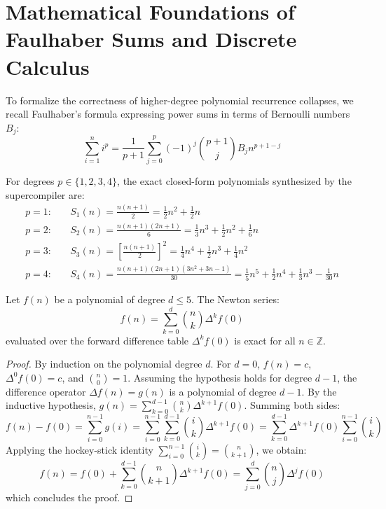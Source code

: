 \section{Mathematical Foundations of Faulhaber Sums and Discrete Calculus}
\label{sec:rec:faulhaber_proofs}

To formalize the correctness of higher-degree polynomial recurrence collapses, we recall Faulhaber's formula expressing power sums in terms of Bernoulli numbers $B_j$:
\begin{equation}
\sum_{i=1}^n i^p = \frac{1}{p+1} \sum_{j=0}^p (-1)^j \binom{p+1}{j} B_j n^{p+1-j}
\end{equation}

For degrees $p \in \{1, 2, 3, 4\}$, the exact closed-form polynomials synthesized by the supercompiler are:
\begin{align}
p=1: \quad & S_1(n) = \frac{n(n+1)}{2} = \frac{1}{2} n^2 + \frac{1}{2} n \\[0.8em]
p=2: \quad & S_2(n) = \frac{n(n+1)(2n+1)}{6} = \frac{1}{3} n^3 + \frac{1}{2} n^2 + \frac{1}{6} n \\[0.8em]
p=3: \quad & S_3(n) = \left[ \frac{n(n+1)}{2} \right]^2 = \frac{1}{4} n^4 + \frac{1}{2} n^3 + \frac{1}{4} n^2 \\[0.8em]
p=4: \quad & S_4(n) = \frac{n(n+1)(2n+1)(3n^2+3n-1)}{30} = \frac{1}{5} n^5 + \frac{1}{2} n^4 + \frac{1}{3} n^3 - \frac{1}{30} n
\end{align}

\begin{theorem}
Let $f(n)$ be a polynomial of degree $d \le 5$. The Newton series:
\begin{equation}
f(n) = \sum_{k=0}^d \binom{n}{k} \Delta^k f(0)
\end{equation}
evaluated over the forward difference table $\Delta^k f(0)$ is exact for all $n \in \mathbb{Z}$.
\end{theorem}
\begin{proof}
By induction on the polynomial degree $d$. For $d=0$, $f(n) = c$, $\Delta^0 f(0) = c$, and $\binom{n}{0} = 1$. Assuming the hypothesis holds for degree $d-1$, the difference operator $\Delta f(n) = g(n)$ is a polynomial of degree $d-1$. By the inductive hypothesis, $g(n) = \sum_{k=0}^{d-1} \binom{n}{k} \Delta^{k+1} f(0)$. Summing both sides:
\begin{equation}
f(n) - f(0) = \sum_{i=0}^{n-1} g(i) = \sum_{i=0}^{n-1} \sum_{k=0}^{d-1} \binom{i}{k} \Delta^{k+1} f(0) = \sum_{k=0}^{d-1} \Delta^{k+1} f(0) \sum_{i=0}^{n-1} \binom{i}{k}
\end{equation}
Applying the hockey-stick identity $\sum_{i=0}^{n-1} \binom{i}{k} = \binom{n}{k+1}$, we obtain:
\begin{equation}
f(n) = f(0) + \sum_{k=0}^{d-1} \binom{n}{k+1} \Delta^{k+1} f(0) = \sum_{j=0}^d \binom{n}{j} \Delta^j f(0)
\end{equation}
which concludes the proof.
\end{proof}

